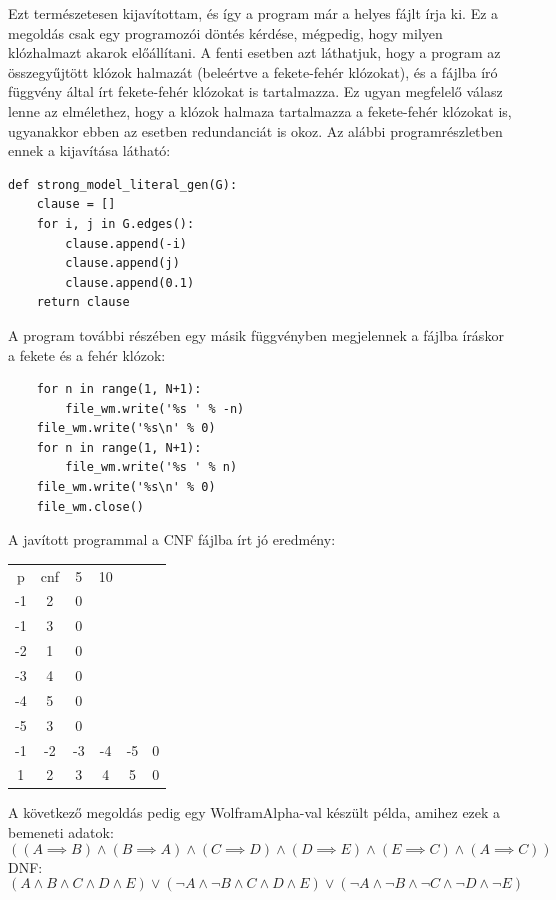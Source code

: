 \documentclass[
]{thesis-ekf}
\theoremstyle{definition}
\theoremstyle{remark}
\begin{document}
	Ezt természetesen kijavítottam, és így a program már a helyes fájlt írja ki. Ez a megoldás csak egy programozói döntés kérdése, mégpedig, hogy milyen klózhalmazt akarok előállítani. A fenti esetben azt láthatjuk, hogy a program az összegyűjtött klózok halmazát (beleértve a fekete-fehér klózokat), és a fájlba író függvény által írt fekete-fehér klózokat is tartalmazza. Ez ugyan megfelelő válasz lenne az elmélethez, hogy a klózok halmaza tartalmazza a fekete-fehér klózokat is, ugyanakkor ebben az esetben redundanciát is okoz. Az alábbi programrészletben ennek a kijavítása látható:
	\newpage
	\begin{lstlisting}
def strong_model_literal_gen(G):
	clause = []
	for i, j in G.edges():
		clause.append(-i)
		clause.append(j)
		clause.append(0.1)
	return clause	
	\end{lstlisting}

A program további részében egy másik függvényben megjelennek a fájlba íráskor a fekete és a fehér klózok:
	\begin{lstlisting}
	for n in range(1, N+1):
		file_wm.write('%s ' % -n)
	file_wm.write('%s\n' % 0)
	for n in range(1, N+1):
		file_wm.write('%s ' % n)
	file_wm.write('%s\n' % 0)
	file_wm.close()
	\end{lstlisting}	
	
	A javított programmal a \textsc{CNF} fájlba írt jó eredmény:

	\begin{tabular}{cccccc}
		p & cnf & 5 & 10 & &   \\
		-1&  2 &  0&   &   &   \\
		-1&  3 &  0&   &   &   \\
		-2&  1 &  0&   &   &   \\
		-3&  4 &  0&   &   &   \\
		-4&  5 &  0&   &   &   \\
		-5&  3 &  0&   &   &   \\
		-1& -2 & -3& -4& -5& 0 \\
		1&  2 &  3&  4&  5& 0 \\
	\end{tabular}

	A következő megoldás pedig egy WolframAlpha-val készült példa, amihez ezek a bemeneti adatok:
	\[ ((A\implies B)\wedge(B\implies A)\wedge(C\implies D)\wedge(D\implies E)\wedge(E\implies C)\wedge(A\implies C)) \]
	\textsc{DNF}:
	\[ (A\wedge B\wedge C\wedge D\wedge E)\vee (\neg A\wedge\neg B\wedge C\wedge D\wedge E)\vee (\neg A\wedge\neg B\wedge\neg C\wedge\neg D\wedge\neg E) \]
	
\end{document}
